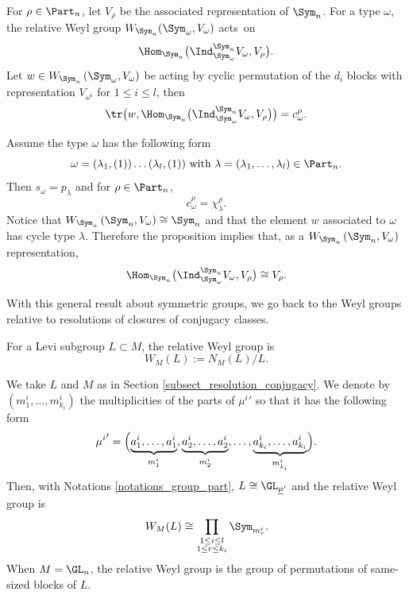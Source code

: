 \begin{proposition}\label{proposition_tr_relative_sym}
For $\rho\in \Part_n$, let $V_{\rho}$ be the asso\-ciated representation of $\Sym_n$. For a type $\omega$, the relative Weyl group $W_{\Sym_n}(\Sym_{\omega},V_{\omega})$ acts~on
\[
\Hom_{\Sym_n} \bigl(\Ind_{\Sym_{\omega}}^{\Sym_n} V_{\omega}, V_{\rho}\bigr).
\]
Let $w\in W_{\Sym_n} \left(\Sym_{\omega},V_{\omega}\right) $ be acting by cyclic permutation of the $d_i$ blocks with representation $V_{\omega^i}$ for $1\le i \le l$, then
\[
\tr \bigl(w, \Hom_{\Sym_n} \bigl(\Ind_{\Sym_{\omega}}^{\Sym_n} V_{\omega}, V_{\rho}\bigr)\bigr) = c_{\omega}^{\rho}.
\]
\end{proposition}
\begin{remark}
Assume the type $\omega$ has the following form
\[
\omega=(\lambda_1, (1))\dots (\lambda_l, (1)) \text{ with } \lambda=(\lambda_1,\dots,\lambda_l)\in\Part_n.
\]
Then $s_{\omega}=p_{\lambda}$ and for $\rho\in\Part_n$,
\[
c^{\rho}_{\omega}= \chi^{\rho}_{\lambda}.
\]
Notice that $W_{\Sym_n}\left(\Sym_n, V_{\omega}\right)\cong \Sym_n$ and that the element $w$ associated to $\omega$ has cycle type $\lambda$. Therefore the proposition implies that, as a $W_{\Sym_n}\left(\Sym_n, V_{\omega}\right)$ representation,
\[
\Hom_{\Sym_n} \bigl(\Ind_{\Sym_{\omega}}^{\Sym_n} V_{\omega}, V_{\rho}\bigr)\cong V_{\rho}.
\]
\end{remark}

With this general result about symmetric groups, we go back to the Weyl groups relative to resolutions of closures of conjugacy classes.

\begin{definition}
For a Levi subgroup $L\subset M$, the relative Weyl group is
\[
W_{M}(L) := N_{M} (L)/L.
\]
\end{definition}

We take $L$ and $M$ as in Section \ref{subsect_resolution_conjugacy}. We denote by $(m^{i}_1,\dots,m^{i}_{k_{i}})$ the multiplicities of the parts of ${\mu^{i}}'$ so that it has the following form
\[
{\mu^{i}}'=\Bigl(\underbrace{a^{i}_1,\dots,a^{i}_1}_{m^{i}_1},\underbrace{a^{i}_2,\dots,a^{i}_2}_{m^{i}_2},\dots, \underbrace{a^{i}_{k_i},\dots,a^{i}_{k_i}}_{m^{i}_{k_i}}\Bigr).
\]
Then, with Notations \ref{notations_group_part}, $L\cong \GL_{\underline{\mu}'}$ and the relative Weyl group is
\[
W_{M}(L) \cong \prod_{\substack{ 1 \le i \le l \\ 1 \le r \le k_{i}}} \Sym_{m^{i}_{r}}.
\]
When $M=\GL_n$, the relative Weyl group is the group of permutations of same-sized blocks of $L$.


